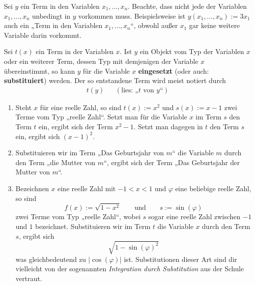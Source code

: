 \begin{bem}
    Sei $y$ ein Term in den Variablen $x_1,\dots , x_n$. Beachte, dass nicht jede der Variablen $x_1,\dots , x_n$ unbedingt in $y$ vorkommen muss. Beispielsweise ist $y(x_1,\dots , x_n):=3x_1$ auch ein „Term in den Variablen $x_1,\dots , x_n$“, obwohl außer $x_1$ gar keine weitere Variable darin vorkommt.
\end{bem}


\begin{de}[* Variablensubstitution] \label{def:substitution}
    Sei $t(x)$ ein Term in der Variablen $x$. Ist $y$ ein Objekt vom Typ der Variablen $x$ oder ein weiterer Term, dessen Typ mit demjenigen der Variable $x$ übereinstimmt, so kann $y$ für die Variable $x$ \textbf{eingesetzt} (oder auch: \textbf{substituiert}) werden. Der so entstandene Term wird meist notiert durch
    \begin{align*}
        t(y) && (\text{lies: „$t$ von $y$“})
    \end{align*}
\end{de}


\begin{bsp}[*] \quad \label{bsp:substitution}
    \begin{enumerate}
        \item Steht $x$ für eine reelle Zahl, so sind $t(x):=x^2$ und $s(x):=x-1$ zwei Terme vom Typ „reelle Zahl“. Setzt man für die Variable $x$ im Term $s$ den Term $t$ ein, ergibt sich der Term $x^2-1$. Setzt man dagegen in $t$ den Term $s$ ein, ergibt sich $(x-1)^2$.
        \item Substituieren wir im Term „Das Geburtsjahr von $m$“ die Variable $m$ durch den Term „die Mutter von $m$“, ergibt sich der Term „Das Geburtsjahr der Mutter von $m$“.
        \item Bezeichnen $x$ eine reelle Zahl mit $-1<x<1$ und $\varphi$ eine beliebige reelle Zahl, so sind
            \[ f(x):=\sqrt{1-x^2} \qquad\text{und}\qquad s:=\sin(\varphi) \]
        zwei Terme vom Typ „reelle Zahl“, wobei $s$ sogar eine reelle Zahl zwischen $-1$ und $1$ bezeichnet. Substituieren wir im Term $t$ die Variable $x$ durch den Term $s$, ergibt sich
            \[ \sqrt{1-\sin(\varphi)^2} \]
        was gleichbedeutend zu $\vert \cos(\varphi)\vert$ ist. Substitutionen dieser Art sind dir vielleicht von der sogenannten \emph{Integration durch Substitution} aus der Schule vertraut.
    \end{enumerate}
\end{bsp}





